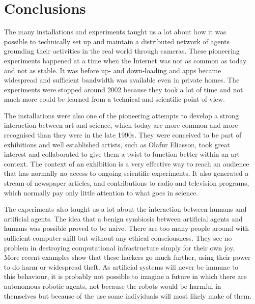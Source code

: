 \section{Conclusions}

The many installations and experiments taught us a lot about how it was possible to technically set up 
and maintain a distributed network of agents grounding their activities in the real world through cameras. 
These pioneering experiments happened at a time when the Internet was not as common as today and not as stable. 
It was before up- and down-loading and apps became widespread and sufficient bandwidth was available 
even in private homes. The experiments were stopped around 2002 because
they took a lot of time and not much more could be learned from a technical and scientific point of view. 

The installations were also one of the pioneering attempts to develop a strong interaction between art and science, 
which today are more common and more recognised than they were in the late 1990s.
They were conceived to be part of exhibitions and well established artists, such as Olafur Eliasson, took great 
interest and collaborated to give them a twist to function better within an art context. 
The context of an exhibition is a very effective way to reach an audience
that has normally no access to ongoing scientific experiments. It also generated a stream of newspaper articles, 
and contributions to radio and television programs, which normally pay only little attention to what goes in science. 

The experiments also taught us a lot about the interaction between humans and artificial agents. The idea that 
a benign symbiosis between artificial agents and humans was possible proved to be naive. There are too many 
people around with sufficient computer 
skill but without any ethical consciousness. They see no problem in destroying computational infrastructure simply for 
their own joy. More recent examples show that these hackers go much further, using their power to do harm or widespread
theft. As artificial systems will never be immune to this behaviour, it is probably not possible to imagine a future in which 
there are autonomous robotic agents, not because the robots would be harmful in themselves but because of 
the use some individuals will most likely make of them. 

